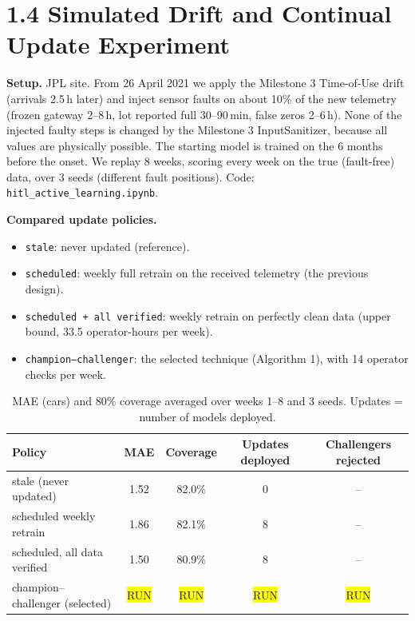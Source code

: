 \documentclass[11pt,letterpaper]{article}
\newcommand{\run}{\colorbox{yellow}{\footnotesize RUN}}
\begin{document}
\section*{1.4 Simulated Drift and Continual Update Experiment}

\textbf{Setup.} JPL site. From 26 April 2021 we apply the Milestone 3 Time-of-Use drift (arrivals 2.5\,h later) and
inject sensor faults on about 10\% of the new telemetry (frozen gateway 2--8\,h, lot reported full 30--90\,min, false
zeros 2--6\,h). None of the injected faulty steps is changed by the Milestone 3 InputSanitizer, because all values are
physically possible. The starting model is trained on the 6 months before the onset. We replay 8 weeks, scoring every
week on the true (fault-free) data, over 3 seeds (different fault positions). Code:
\texttt{hitl\_active\_learning.ipynb}.

\textbf{Compared update policies.}
\begin{itemize}
  \item \texttt{stale}: never updated (reference).
  \item \texttt{scheduled}: weekly full retrain on the received telemetry (the previous design).
  \item \texttt{scheduled + all verified}: weekly retrain on perfectly clean data (upper bound, 33.5 operator-hours per week).
  \item \texttt{champion--challenger}: the selected technique (Algorithm 1), with 14 operator checks per week.
\end{itemize}

\begin{table}[H]
\centering\small
\caption{MAE (cars) and 80\% coverage averaged over weeks 1--8 and 3 seeds. Updates = number of models deployed.}
\begin{tabular}{@{}lcccc@{}}
\toprule
Policy & MAE & Coverage & Updates deployed & Challengers rejected \\
\midrule
stale (never updated)            & 1.52 & 82.0\% & 0 & -- \\
scheduled weekly retrain         & 1.86 & 82.1\% & 8 & -- \\
scheduled, all data verified     & 1.50 & 80.9\% & 8 & -- \\
champion--challenger (selected)  & \run & \run & \run & \run \\
\bottomrule
\end{tabular}
\end{table}
\end{document}
